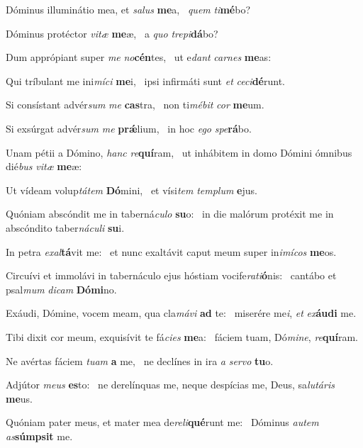 \item Dóminus illuminátio mea, et \textit{salus} \textbf{me}a,~\psstar{} \textit{quem} \textit{ti}\textbf{mé}bo?
\item Dóminus protéctor \textit{vitæ} \textbf{me}æ,~\psstar{} a \textit{quo} \textit{trepi}\textbf{dá}bo?
\item Dum apprópiant super \textit{me} \textit{no}\textbf{cén}tes,~\psstar{} ut e\textit{dant} \textit{carnes} \textbf{me}as:
\item Qui tríbulant me ini\textit{míci} \textbf{me}i,~\psstar{} ipsi infirmáti sunt \textit{et} \textit{ceci}\textbf{dé}runt.
\item Si consístant advér\textit{sum} \textit{me} \textbf{cas}tra,~\psstar{} non ti\textit{mébit} \textit{cor} \textbf{me}um.
\item Si exsúrgat advér\textit{sum} \textit{me} \textbf{prǽ}lium,~\psstar{} in hoc \textit{ego} \textit{spe}\textbf{rá}bo.
\item Unam pétii a Dómino, \textit{hanc} \textit{re}\textbf{quí}ram,~\psstar{} ut inhábitem in domo Dómini ómnibus dié\textit{bus} \textit{vitæ} \textbf{me}æ:
\item Ut vídeam volup\textit{tátem} \textbf{Dó}mini,~\psstar{} et vísi\textit{tem} \textit{templum} \textbf{e}jus.
\item Quóniam abscóndit me in taberná\textit{culo} \textbf{su}o:~\psstar{} in die malórum protéxit me in abscóndito taber\textit{náculi} \textbf{su}i.
\item In petra \textit{exal}\textbf{tá}vit me:~\psstar{} et nunc exaltávit caput meum super in\textit{imícos} \textbf{me}os.
\item Circuívi et immolávi in tabernáculo ejus hóstiam vocife\textit{rati}\textbf{ó}nis:~\psstar{} cantábo et psal\textit{mum} \textit{dicam} \textbf{Dó}\textbf{mi}no.
\item Exáudi, Dómine, vocem meam, qua cla\textit{mávi} \textbf{ad} te:~\psstar{} miserére me\textit{i}, \textit{et} \textit{ex}\textbf{áu}\textbf{di} me.
\item Tibi dixit cor meum, exquisívit te fá\textit{cies} \textbf{me}a:~\psstar{} fáciem tuam, Dó\textit{mine}, \textit{re}\textbf{quí}ram.
\item Ne avértas fáciem \textit{tuam} \textbf{a} me,~\psstar{} ne declínes in ira \textit{a} \textit{servo} \textbf{tu}o.
\item Adjútor \textit{meus} \textbf{es}to:~\psstar{} ne derelínquas me, neque despícias me, Deus, sa\textit{lutáris} \textbf{me}us.
\item Quóniam pater meus, et mater mea de\textit{reli}\textbf{qué}runt me:~\psstar{} Dóminus \textit{autem} \textit{as}\textbf{súmp}\textbf{sit} me.
